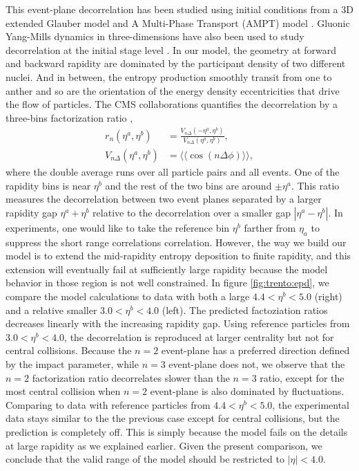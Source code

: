 This event-plane decorrelation has been studied using initial conditions from a 3D extended Glauber model \cite{Bozek:2015bna} and A Multi-Phase Transport (AMPT) model \cite{Jia:2014ysa, Xiao:2012uw,Pang:2015zrq}.
Gluonic Yang-Mills dynamics in three-dimensions have also been used to study decorrelation at the initial stage level \cite{Schenke:2016ksl}.
In our model, the geometry at forward and backward rapidity are dominated by the participant density of two different nuclei.
And in between, the entropy production smoothly transit from one to anther and so are the orientation of the energy density eccentricities that drive the flow of particles.
The CMS collaborations quantifies the decorrelation by a three-bins factorization ratio \cite{Khachatryan:2015oea},
\begin{eqnarray}
r_n(\eta^a, \eta^b) &= \frac{V_{n\Delta}(-\eta^a, \eta^b)}{V_{n\Delta}(\eta^a, \eta^b)}, \\
V_{n\Delta}(\eta^a, \eta^b) &= \langle\langle \cos(n\Delta\phi) \rangle\rangle,
\end{eqnarray}
where the double average runs over all particle pairs and all events.
One of the rapidity bins is near $\eta^b$ and the rest of the two bins are around $\pm\eta^a$.
This ratio measures the decorrelation between two event planes separated by a larger rapidity gap $\eta^a + \eta^b$ relative to the decorrelation over a smaller gap $|\eta^a - \eta^b|$.
In experiments, one would like to take the reference bin $\eta^b$ farther from $\eta_a$ to suppress the short range correlations correlation.
However, the way we build our model is to extend the mid-rapidity entropy deposition to finite rapidity, and this extension will eventually fail at sufficiently large rapidity because the model behavior in those region is not well constrained.
In figure \ref{fig:trento:epd}, we compare the model calculations to data with both a large $4.4<\eta^b<5.0$ (right) and a relative smaller $3.0 < \eta^b< 4.0$ (left).
The predicted factoziation ratios decreases linearly with the increasing rapidity gap.
Using reference particles from $3.0 < \eta^b< 4.0$, the decorrelation is reproduced at larger centrality but not for central collisions.
Because the $n=2$ event-plane has a preferred direction defined by the impact parameter, while $n=3$ event-plane does not, we observe that the $n=2$ factorization ratio decorrelates slower than the $n=3$ ratio, except for the most central collision when $n=2$ event-plane is also dominated by fluctuations.
Comparing to data with reference particles from $4.4<\eta^b<5.0$, the experimental data stays similar to the the previous case except for central collisions, but the prediction is completely off.
This is simply because the model fails on the details at large rapidity as we explained earlier.
Given the present comparison, we conclude that the valid range of the model should be restricted to $|\eta| < 4.0$.

